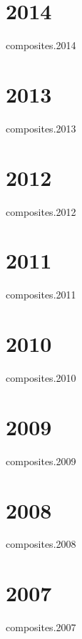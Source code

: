 \documentclass[12pt]{article}
\begin{document}
\section*{2014}
\begin{btSect}{composites.2014}
\btPrintAll
\end{btSect}


\section*{2013}
\begin{btSect}{composites.2013}
\btPrintAll
\end{btSect}

\section*{2012}
\begin{btSect}{composites.2012}
\btPrintAll
\end{btSect}

\section*{2011}
\begin{btSect}{composites.2011}
\btPrintAll
\end{btSect}

\section*{2010}
\begin{btSect}{composites.2010}
\btPrintAll
\end{btSect}

\section*{2009}
\begin{btSect}{composites.2009}
\btPrintAll
\end{btSect}
%
\section*{2008}
\begin{btSect}{composites.2008}
\btPrintAll
\end{btSect}
%
\section*{2007}
\begin{btSect}{composites.2007}
\btPrintAll
\end{btSect}
%
%
\end{document}
